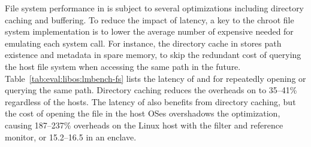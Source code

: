 \label{sec:eval:libos:fs}

File system performance in \thelibos{}
is subject to several optimizations including directory caching and buffering.
To reduce the impact of \hostapi{} latency,
a key to the chroot file system implementation
is to lower the average number of expensive \hostapis{}
needed for emulating each system call.
For instance, the directory cache
in \thelibos{} stores path existence and metadata
in spare \picoproc{} memory,
to skip the redundant cost
of querying the host file system
when accessing the same path in the future.
Table~\ref{tab:eval:libos:lmbench-fs} lists the latency of  and 
for repeatedly opening or querying the same path.
Directory caching
reduces the overheads on  to 35--41\%
regardless of the hosts.
The latency of 
also benefits from directory caching, but the cost of opening the file in the host OSes
overshadows the optimization,
causing 187--237\% overheads on the Linux host with the \seccomp{} filter and reference monitor,
or 15.2--16.5\x{} in an enclave.






